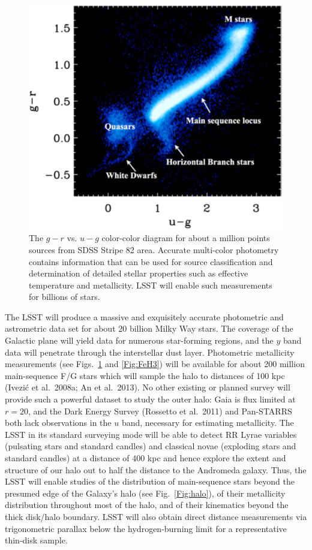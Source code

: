 \begin{figure}
\includegraphics[width=1.0\hsize,clip]{MarlaUGR.pdf}
\caption{The $g-r$ vs. $u-g$ color-color diagram for about a million points sources
from SDSS Stripe 82 area. Accurate multi-color photometry
contains information that can be used for source classification and determination of
detailed stellar properties such as effective temperature and metallicity. LSST will
enable such measurements for billions of stars.}
\label{Fig:FeH}
\end{figure}


The LSST will produce a massive and exquisitely accurate photometric and astrometric data set for about 20 billion
Milky Way stars. The coverage of the Galactic plane will yield data for numerous star-forming
regions, and the $y$ band data will penetrate through the interstellar dust layer. Photometric metallicity
measurements (see Figs.~\ref{Fig:FeH} and \ref{Fig:FeH3}) will be available for about 200 million main-sequence
F/G stars which will sample the halo to distances of 100 kpc (Ivezi\'{c} et al.~2008a; An et al.~2013). No other
existing or planned survey will provide such a powerful dataset to
study the outer halo: Gaia
is flux limited at $r=20$, and the Dark Energy Survey (Rossetto et al.~2011) and Pan-STARRS both
lack observations in the $u$ band, necessary for estimating metallicity. The LSST in its standard surveying mode will
be able to detect RR Lyrae variables (pulsating stars and standard candles) and classical novae (exploding stars
and standard candles) at a distance of 400 kpc and hence explore the extent and structure of our  halo out to
half the distance to the Andromeda galaxy. Thus, the LSST will enable studies of the distribution of main-sequence
stars beyond the presumed edge of the Galaxy's halo (see Fig.~\ref{Fig:halo}), of their metallicity distribution
throughout most of the halo, and of their kinematics beyond the thick disk/halo boundary. LSST will also obtain
direct distance measurements via trigonometric parallax below the hydrogen-burning limit for a representative
thin-disk sample.

